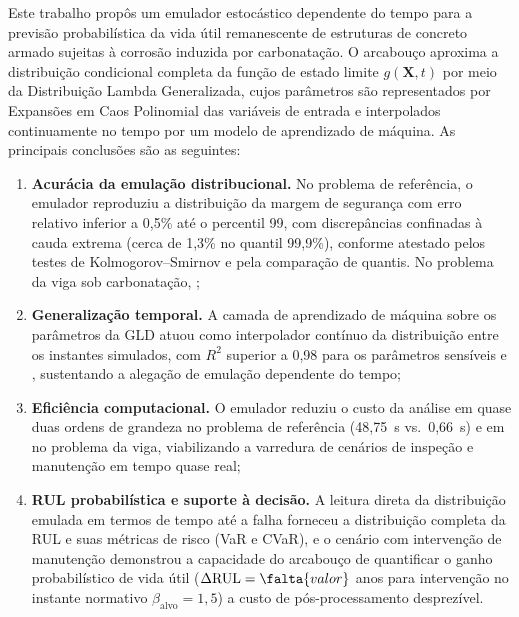 
Este trabalho propôs um emulador estocástico dependente do tempo para a previsão probabilística da vida útil remanescente de estruturas de concreto armado sujeitas à corrosão induzida por carbonatação. O arcabouço aproxima a distribuição condicional completa da função de estado limite $g(\mathbf{X},t)$ por meio da Distribuição Lambda Generalizada, cujos parâmetros são representados por Expansões em Caos Polinomial das variáveis de entrada e interpolados continuamente no tempo por um modelo de aprendizado de máquina. As principais conclusões são as seguintes:

\begin{enumerate}
    \item \textbf{Acurácia da emulação distribucional.} No problema de referência, o emulador reproduziu a distribuição da margem de segurança com erro relativo inferior a 0,5\% até o percentil 99, com discrepâncias confinadas à cauda extrema (cerca de 1,3\% no quantil 99,9\%), conforme atestado pelos testes de Kolmogorov--Smirnov e pela comparação de quantis. No problema da viga sob carbonatação, ;

    \item \textbf{Generalização temporal.} A camada de aprendizado de máquina sobre os parâmetros da GLD atuou como interpolador contínuo da distribuição entre os instantes simulados, com $R^2$ superior a 0,98 para os parâmetros sensíveis e , sustentando a alegação de emulação dependente do tempo;

    \item \textbf{Eficiência computacional.} O emulador reduziu o custo da análise em quase duas ordens de grandeza no problema de referência (48,75~s vs.\ 0,66~s) e em  no problema da viga, viabilizando a varredura de cenários de inspeção e manutenção em tempo quase real;

    \item \textbf{RUL probabilística e suporte à decisão.} A leitura direta da distribuição emulada em termos de tempo até a falha forneceu a distribuição completa da RUL e suas métricas de risco (VaR e CVaR), e o cenário com intervenção de manutenção demonstrou a capacidade do arcabouço de quantificar o ganho probabilístico de vida útil ($\Delta\mathrm{RUL} = \falta{valor}$ anos para intervenção no instante normativo $\beta_{\mathrm{alvo}} = 1{,}5$) a custo de pós-processamento desprezível.
\end{enumerate}

